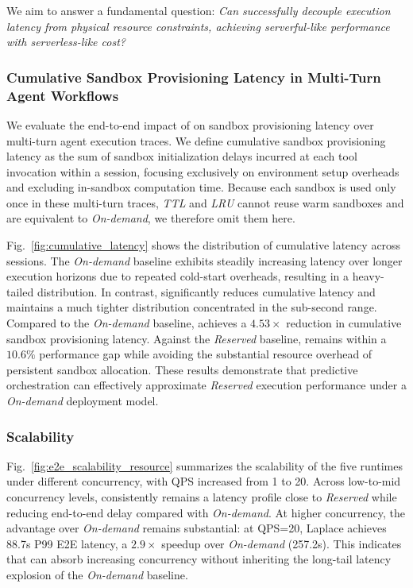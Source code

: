 We aim to answer a fundamental question: \textit{Can \SystemName successfully decouple execution latency from physical resource constraints, achieving serverful-like performance with serverless-like cost?}

\subsubsection{Cumulative Sandbox Provisioning Latency in Multi-Turn Agent Workflows}
\label{sec:exp:cumulative_latency}

We evaluate the end-to-end impact of \SystemName on sandbox provisioning latency over multi-turn agent execution traces. We define cumulative sandbox provisioning latency as the sum of sandbox initialization delays incurred at each tool invocation within a session, focusing exclusively on environment setup overheads and excluding in-sandbox computation time. Because each sandbox is used only once in these multi-turn traces, \textit{TTL} and \textit{LRU} cannot reuse warm sandboxes and are equivalent to \textit{On-demand}, we therefore omit them here.

Fig.~\ref{fig:cumulative_latency} shows the distribution of cumulative latency across sessions. The \textit{On-demand} baseline exhibits steadily increasing latency over longer execution horizons due to repeated cold-start overheads, resulting in a heavy-tailed distribution. In contrast, \SystemName significantly reduces cumulative latency and maintains a much tighter distribution concentrated in the sub-second range. Compared to the \textit{On-demand} baseline, \SystemName achieves a $4.53\times$ reduction in cumulative sandbox provisioning latency. Against the \textit{Reserved} baseline, \SystemName remains within a $10.6\%$ performance gap while avoiding the substantial resource overhead of persistent sandbox allocation. These results demonstrate that predictive orchestration can effectively approximate \textit{Reserved} execution performance under a \textit{On-demand} deployment model.

\subsubsection{Scalability}
\label{sec:exp:e2e_scalability}

Fig.~\ref{fig:e2e_scalability_resource} summarizes the scalability of the five runtimes under different concurrency, with QPS increased from 1 to 20. Across low-to-mid concurrency levels, \SystemName consistently remains a latency profile close to \textit{Reserved} while reducing end-to-end delay compared with \textit{On-demand}. At higher concurrency, the advantage over \textit{On-demand} remains substantial: at QPS=20, Laplace achieves 88.7s P99 E2E latency, a $2.9\times$ speedup over \textit{On-demand} (257.2s). This indicates that \SystemName can absorb increasing concurrency without inheriting the long-tail latency explosion of the \textit{On-demand} baseline.


